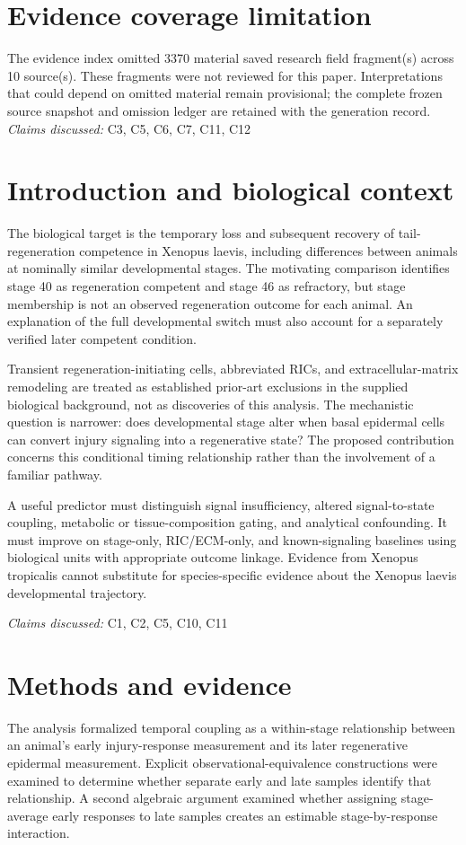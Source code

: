 \documentclass[11pt]{article}
\begin{document}
\section*{Evidence coverage limitation}
The evidence index omitted 3370 material saved research field fragment(s) across 10 source(s). These fragments were not reviewed for this paper. Interpretations that could depend on omitted material remain provisional; the complete frozen source snapshot and omission ledger are retained with the generation record.
\textit{Claims discussed: }C3, C5, C6, C7, C11, C12
\section{Introduction and biological context}
The biological target is the temporary loss and subsequent recovery of tail-regeneration competence in Xenopus laevis, including differences between animals at nominally similar developmental stages. The motivating comparison identifies stage 40 as regeneration competent and stage 46 as refractory, but stage membership is not an observed regeneration outcome for each animal. An explanation of the full developmental switch must also account for a separately verified later competent condition.

Transient regeneration-initiating cells, abbreviated RICs, and extracellular-matrix remodeling are treated as established prior-art exclusions in the supplied biological background, not as discoveries of this analysis. The mechanistic question is narrower: does developmental stage alter when basal epidermal cells can convert injury signaling into a regenerative state? The proposed contribution concerns this conditional timing relationship rather than the involvement of a familiar pathway.

A useful predictor must distinguish signal insufficiency, altered signal-to-state coupling, metabolic or tissue-composition gating, and analytical confounding. It must improve on stage-only, RIC/ECM-only, and known-signaling baselines using biological units with appropriate outcome linkage. Evidence from Xenopus tropicalis cannot substitute for species-specific evidence about the Xenopus laevis developmental trajectory.

\textit{Claims discussed: }C1, C2, C5, C10, C11
\section{Methods and evidence}
The analysis formalized temporal coupling as a within-stage relationship between an animal's early injury-response measurement and its later regenerative epidermal measurement. Explicit observational-equivalence constructions were examined to determine whether separate early and late samples identify that relationship. A second algebraic argument examined whether assigning stage-average early responses to late samples creates an estimable stage-by-response interaction.
\end{document}
